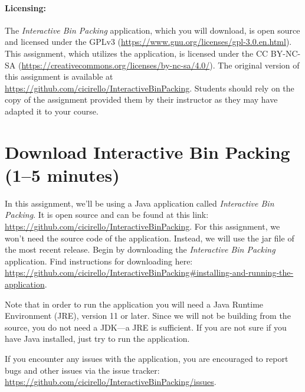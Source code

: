 \documentclass[11pt,letterpaper]{article}
\begin{document}
\paragraph*{Licensing:} The {\em Interactive Bin Packing} application,
which you will download, is open source and licensed under the GPLv3 
(\url{https://www.gnu.org/licenses/gpl-3.0.en.html}). This assignment,
which utilizes the application, is licensed under the CC BY-NC-SA
(\url{https://creativecommons.org/licenses/by-nc-sa/4.0/}). The original
version of this assignment is available 
at \url{https://github.com/cicirello/InteractiveBinPacking}. Students 
should rely on the copy of the assignment provided them by their instructor
as they may have adapted it to your course. 

\section{Download Interactive Bin Packing (1--5 minutes)}\label{sec:download}
In this assignment, we'll be using a Java application 
called {\em Interactive Bin Packing}. It is open source and
can be found at this 
link: \url{https://github.com/cicirello/InteractiveBinPacking}.
For this assignment, we won't need the source code of the application.
Instead, we will use the jar file of the most recent release.
Begin by downloading the {\em Interactive Bin Packing}
application. Find instructions for downloading
here: \url{https://github.com/cicirello/InteractiveBinPacking#installing-and-running-the-application}. 

Note that in order to run the application you will need
a Java Runtime Environment (JRE), version 11 or later. Since we will
not be building from the source, you do not need a JDK---a JRE is sufficient.
If you are not sure if you have Java installed, just try to run the 
application. 

If you encounter any issues with the application, you are encouraged to
report bugs and other issues via the issue tracker: 
\url{https://github.com/cicirello/InteractiveBinPacking/issues}.
\end{document}
